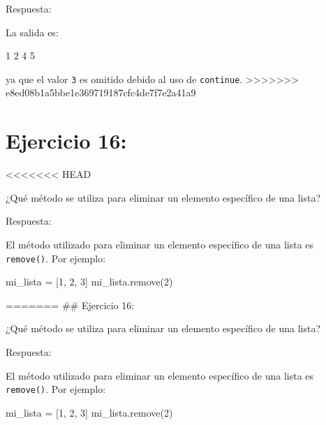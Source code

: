 \documentclass[
  a4paper,
  DIV=11,
  numbers=noendperiod,
  onepage,
  openany]{scrreprt}
\newenvironment{Shaded}{\begin{snugshade}}{\end{snugshade}}
\newcommand{\DecValTok}[1]{\textcolor[rgb]{0.68,0.00,0.00}{#1}}
\newcommand{\ExtensionTok}[1]{\textcolor[rgb]{0.00,0.23,0.31}{#1}}
\newcommand{\NormalTok}[1]{\textcolor[rgb]{0.00,0.23,0.31}{#1}}
\newcommand{\OperatorTok}[1]{\textcolor[rgb]{0.37,0.37,0.37}{#1}}
\begin{document}
Respuesta:

La salida es:

\begin{Shaded}
\begin{Highlighting}[]
\ExtensionTok{1}
\ExtensionTok{2}
\ExtensionTok{4}
\ExtensionTok{5}
\end{Highlighting}
\end{Shaded}

ya que el valor \texttt{3} es omitido debido al uso de
\texttt{continue}.
\textgreater\textgreater\textgreater\textgreater\textgreater\textgreater\textgreater{}
e8ed08b1a5bbe1e369719187cfc4de7f7e2a41a9

\hypertarget{ejercicio-16}{%
\chapter{Ejercicio 16:}\label{ejercicio-16}}

\textless\textless\textless\textless\textless\textless\textless{} HEAD

¿Qué método se utiliza para eliminar un elemento específico de una
lista?

Respuesta:

El método utilizado para eliminar un elemento específico de una lista es
\texttt{remove()}. Por ejemplo:

\begin{Shaded}
\begin{Highlighting}[]
\NormalTok{mi\_lista }\OperatorTok{=}\NormalTok{ [}\DecValTok{1}\NormalTok{, }\DecValTok{2}\NormalTok{, }\DecValTok{3}\NormalTok{]}
\NormalTok{mi\_lista.remove(}\DecValTok{2}\NormalTok{)}
\end{Highlighting}
\end{Shaded}

======= \#\# Ejercicio 16:

¿Qué método se utiliza para eliminar un elemento específico de una
lista?

Respuesta:

El método utilizado para eliminar un elemento específico de una lista es
\texttt{remove()}. Por ejemplo:

\begin{Shaded}
\begin{Highlighting}[]
\NormalTok{mi\_lista }\OperatorTok{=}\NormalTok{ [}\DecValTok{1}\NormalTok{, }\DecValTok{2}\NormalTok{, }\DecValTok{3}\NormalTok{]}
\NormalTok{mi\_lista.remove(}\DecValTok{2}\NormalTok{)}
\end{Highlighting}
\end{Shaded}
\end{document}
